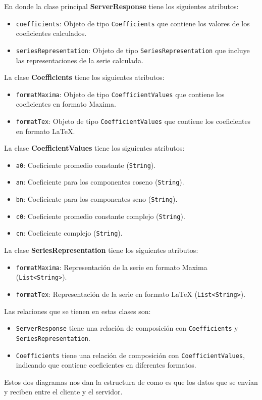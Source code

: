 En donde la clase principal \textbf{ServerResponse} tiene los siguientes atributos:
\begin{itemize}
	\item \texttt{coefficients}: Objeto de tipo \texttt{Coefficients} que contiene los valores de los coeficientes calculados.
	\item \texttt{seriesRepresentation}: Objeto de tipo \texttt{SeriesRepresentation} que incluye las representaciones de la serie calculada.
\end{itemize}


La clase \textbf{Coefficients} tiene los siguientes atributos: 
\begin{itemize}
	\item \texttt{formatMaxima}: Objeto de tipo \texttt{CoefficientValues} que contiene los coeficientes en formato Maxima.
	\item \texttt{formatTex}: Objeto de tipo \texttt{CoefficientValues} que contiene los coeficientes en formato LaTeX.
\end{itemize}


La clase \textbf{CoefficientValues} tiene los siguientes atributos:
\begin{itemize}
	\item \texttt{a0}: Coeficiente promedio constante  (\texttt{String}).
	\item \texttt{an}: Coeficiente para los componentes coseno (\texttt{String}).
	\item \texttt{bn}: Coeficiente para los componentes seno (\texttt{String}).
	\item \texttt{c0}: Coeficiente promedio constante complejo (\texttt{String}).
	\item \texttt{cn}: Coeficiente complejo (\texttt{String}).
\end{itemize}


La clase \textbf{SeriesRepresentation} tiene los siguientes atributos:
\begin{itemize}
	\item \texttt{formatMaxima}: Representación de la serie en formato Maxima (\texttt{List<String>}).
	\item \texttt{formatTex}: Representación de la serie en formato LaTeX (\texttt{List<String>}).
\end{itemize}


Las relaciones que se tienen en estas clases son:
\begin{itemize}
	\item \texttt{ServerResponse} tiene una relación de composición con \texttt{Coefficients} y \texttt{SeriesRepresentation}.
	\item \texttt{Coefficients} tiene una relación de composición con \texttt{CoefficientValues}, indicando que contiene coeficientes en diferentes formatos.
\end{itemize}
Estos dos diagramas nos dan la estructura de como es que los datos que se envían y reciben entre el cliente y el servidor.


